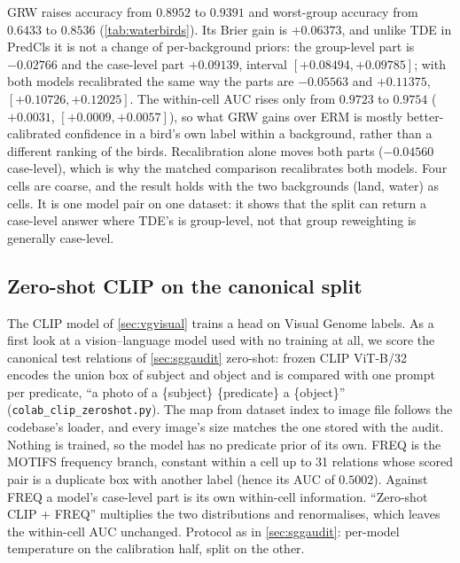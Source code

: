 GRW raises accuracy from $0.8952$ to $0.9391$ and worst-group accuracy from $0.6433$ to
$0.8536$ (\cref{tab:waterbirds}). Its Brier gain is $+0.06373$, and unlike TDE in PredCls it
is not a change of per-background priors: the group-level part is $-0.02766$ and the case-level
part $+0.09139$, interval $[+0.08494,+0.09785]$; with both models recalibrated the same way
the parts are $-0.05563$ and $+0.11375$, $[+0.10726,+0.12025]$. The within-cell AUC rises
only from $0.9723$ to $0.9754$ ($+0.0031$, $[+0.0009,+0.0057]$), so what GRW gains
over ERM is mostly better-calibrated confidence in a bird's own label within a background, rather than a
different ranking of the birds. Recalibration alone moves both parts ($-0.04560$ case-level), which is why the matched comparison
recalibrates both models. Four cells are coarse, and the result holds with the two
backgrounds (land, water) as cells. It is one model pair on one dataset: it shows that the
split can return a case-level answer where TDE's is group-level, not that group
reweighting is generally case-level.

\begin{table}[t]
\centering
\footnotesize
\setlength\tabcolsep{4pt}
\caption{\textbf{Waterbirds, GRW against ERM}: Brier split with the log-score case-level part,
test split, cells by background scene; below, accuracy, worst-group accuracy and within-cell AUC.}
\label{tab:waterbirds}

\end{table}

\subsection{Zero-shot CLIP on the canonical split}\label{app:zeroshot}

The CLIP model of \cref{sec:vgvisual} trains a head on Visual Genome labels. As a first look
at a vision--language model used with no training at all, we score the canonical test relations of \cref{sec:sggaudit}
zero-shot: frozen CLIP ViT-B/32~\cite{radford2021learning} encodes the union box of subject
and object and is compared with one prompt per predicate, ``a photo of a \{subject\}
\{predicate\} a \{object\}'' (\texttt{colab\_clip\_zeroshot.py}). The map from dataset index
to image file follows the codebase's loader, and every image's size matches the one stored
with the audit. Nothing is trained, so the model has no predicate prior of its own. FREQ is
the MOTIFS frequency branch, constant within a cell up to 31 relations whose scored pair is a
duplicate box with another label (hence its AUC of $0.5002$). Against FREQ a model's
case-level part is its own within-cell information. ``Zero-shot CLIP + FREQ'' multiplies the
two distributions and renormalises, which leaves the within-cell AUC unchanged. Protocol as in
\cref{sec:sggaudit}: per-model temperature on the calibration half, split on the other.

